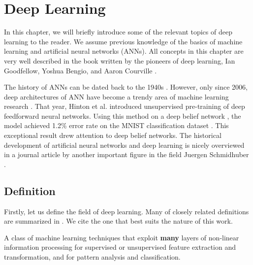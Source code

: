 \chapter{Deep Learning}\label{deep_learning_chapter}


In this chapter, we will briefly introduce some of the relevant topics of deep learning to the reader. We assume previous knowledge of the basics of machine learning and artificial neural networks (ANNs). All concepts in this chapter are very well described in the book written by the pioneers of deep learning, Ian Goodfellow, Yoshua Bengio, and Aaron Courville \cite{Goodfellow-et-al-2016}. 

The history of ANNs can be dated back to the 1940s \cite{McCulloch_1943}. However, only since 2006, deep architectures of ANN have become a trendy area of machine learning research \cite{DBLP:journals/corr/Schmidhuber14}. That year, Hinton et al. introduced unsupervised pre-training of deep feedforward neural networks. Using this method on a deep belief network \cite{DBN}, the model achieved 1.2\% error rate on the MNIST classification dataset \cite{mnist}. This exceptional result drew attention to deep belief networks. The historical development of artificial neural networks and deep learning is nicely overviewed in a journal article by another important figure in the field Juergen Schmidhuber 
\cite{DBLP:journals/corr/Schmidhuber14}.

\section{Definition}
Firstly, let us define the field of deep learning. Many of closely related definitions are summarized in \cite{mic_definitions}. We cite the one that best suits the nature of this work.  
    
\theoremstyle{definition}
\begin{definition}
A class of machine learning techniques that exploit \textbf{many} layers of non-linear information processing for supervised or unsupervised feature extraction and transformation, and for pattern analysis and classification.
\end{definition}


